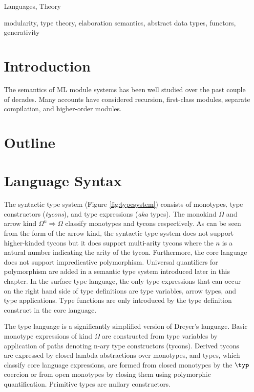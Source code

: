 \documentclass[9pt,nocopyrightspace, fleqn]{sigplanconf}
\begin{document}
\terms 
Languages, Theory

\keywords
modularity, type theory, elaboration semantics, abstract data types, functors, generativity

\section{Introduction}

The semantics of ML module systems \cite{macqueen:popl86} has been
well studied over the past couple of decades. Many accounts have
considered recursion, first-class modules, separate compilation, and
higher-order modules. 

\section{Outline}


\section{Language Syntax}


The syntactic type system (Figure \ref{fig:typesystem}) consists of
monotypes, type constructors (\emph{tycons}), and type expressions
(\emph{aka} types). The monokind $\Omega$ and arrow kind $\Omega^n
\Rightarrow \Omega$ classify monotypes and tycons respectively. As can
be seen from the form of the arrow kind, the syntactic type system
does not support higher-kinded tycons but it does support multi-arity
tycons where the $n$ is a natural number indicating the arity of the
tycon. Furthermore, the core language does not support impredicative
polymorphism. Universal quantifiers for polymorphism are added in a
semantic type system introduced later in this chapter. In the surface
type language, the only type expressions that can occur on the right
hand side of type definitions are type variables, arrow types, and
type applications. Type functions are only introduced by the type
definition construct in the core language.



The type language is a significantly simplified version of Dreyer's
language\cite{dreyerthesis}.  Basic monotype expressions of kind
$\Omega$ are constructed from type variables by application of paths
denoting n-ary type constructors (tycons).  Derived tycons are
expressed by closed lambda abstractions over monotypes, and types,
which classify core language expressions, are formed from closed
monotypes by the $\typ$ coercion or from open monotypes by closing 
them using polymorphic quantification.  Primitive types are nullary constructors.
\end{document}

